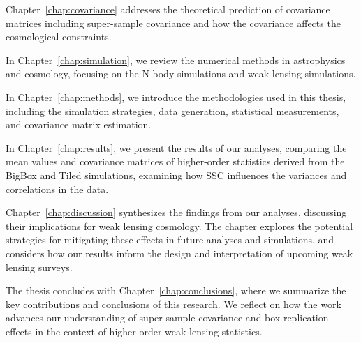 Chapter~\ref{chap:covariance} addresses the theoretical prediction of covariance matrices including super-sample covariance and how the covariance affects the cosmological constraints. 

In Chapter~\ref{chap:simulation}, we review the numerical methods in astrophysics and cosmology, focusing on the N-body simulations and weak lensing simulations. 

In Chapter~\ref{chap:methods}, we introduce the methodologies used in this thesis, including the simulation strategies, data generation, statistical measurements, and covariance matrix estimation.

In Chapter~\ref{chap:results}, we present the results of our analyses, comparing the mean values and covariance matrices of higher-order statistics derived from the BigBox and Tiled simulations, examining how SSC influences the variances and correlations in the data.

Chapter~\ref{chap:discussion} synthesizes the findings from our analyses, discussing their implications for weak lensing cosmology. The chapter explores the potential strategies for mitigating these effects in future analyses and simulations, and considers how our results inform the design and interpretation of upcoming weak lensing surveys.

The thesis concludes with Chapter~\ref{chap:conclusions}, where we summarize the key contributions and conclusions of this research. We reflect on how the work advances our understanding of super-sample covariance and box replication effects in the context of higher-order weak lensing statistics.